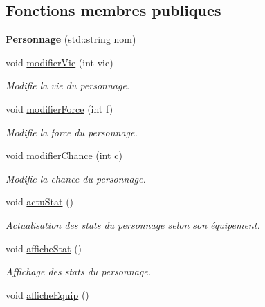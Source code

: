 \subsection*{Fonctions membres publiques}
\begin{DoxyCompactItemize}
\item 
\hypertarget{class_personnage_a7b67c1690f8588ad97a445692ffb49fd}{{\bfseries Personnage} (std\-::string nom)}\label{class_personnage_a7b67c1690f8588ad97a445692ffb49fd}

\item 
void \hyperlink{class_personnage_a9362a76b5b3219916d68697e0606bf2c}{modifier\-Vie} (int vie)
\begin{DoxyCompactList}\small\item\em Modifie la vie du personnage. \end{DoxyCompactList}\item 
void \hyperlink{class_personnage_ade3579c11cd6e6c535ff7290c5248ff5}{modifier\-Force} (int f)
\begin{DoxyCompactList}\small\item\em Modifie la force du personnage. \end{DoxyCompactList}\item 
void \hyperlink{class_personnage_a9ebc2089ffd538189715e3cc58bab4e0}{modifier\-Chance} (int c)
\begin{DoxyCompactList}\small\item\em Modifie la chance du personnage. \end{DoxyCompactList}\item 
\hypertarget{class_personnage_a540b4f0590d9ee6f11e10c335ff740a8}{void \hyperlink{class_personnage_a540b4f0590d9ee6f11e10c335ff740a8}{actu\-Stat} ()}\label{class_personnage_a540b4f0590d9ee6f11e10c335ff740a8}

\begin{DoxyCompactList}\small\item\em Actualisation des stats du personnage selon son équipement. \end{DoxyCompactList}\item 
\hypertarget{class_personnage_a960d6680688c5bee1868ef7238849e7b}{void \hyperlink{class_personnage_a960d6680688c5bee1868ef7238849e7b}{affiche\-Stat} ()}\label{class_personnage_a960d6680688c5bee1868ef7238849e7b}

\begin{DoxyCompactList}\small\item\em Affichage des stats du personnage. \end{DoxyCompactList}\item 
\hypertarget{class_personnage_abfa0fbd5f6c38c7297964046de26db0a}{void \hyperlink{class_personnage_abfa0fbd5f6c38c7297964046de26db0a}{affiche\-Equip} ()}\label{class_personnage_abfa0fbd5f6c38c7297964046de26db0a}


\end{DoxyCompactItemize}
